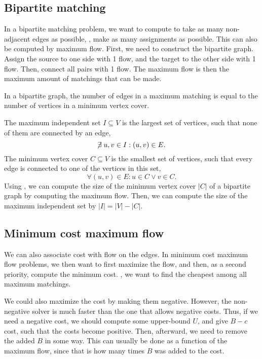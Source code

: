 \documentclass[justified,nobib]{tufte-handout}
\begin{document}
\subsection{Bipartite matching}

In a bipartite matching problem, we want to compute to take as many non-adjacent edges as possible,
\ie, make as many assignments as possible. This can also be computed by maximum flow. First, we
need to construct the bipartite graph. Assign the source to one side with 1 flow, and the target to
the other side with 1 flow. Then, connect all pairs with 1 flow. The maximum flow is then the
maximum amount of matchings that can be made.

\begin{theorem}[K\"onig]
    \label{thm:konig}

    In a bipartite graph, the number of edges in a maximum matching is equal to the number of vertices
    in a minimum vertex cover.
\end{theorem}

The maximum independent set $I\subseteq V$ is the largest set of vertices, such that none of them
are connected by an edge, \[
    \centernot \exists u,v\in I : (u,v) \in E.
\]
The minimum vertex cover $C \subseteq V$ is the smallest set of vertices, such that every edge is
connected to one of the vertices in this set, \[
    \forall (u,v) \in E : u \in C \lor v \in C.
\]
Using , we can compute the size of the minimum vertex cover $|C|$ of a bipartite
graph by computing the maximum flow. Then, we can compute the size of the maximum independent set
by $|I| = |V| - |C|$.

\subsection{Minimum cost maximum flow}


We can also associate cost with flow on the edges. In minimum cost maximum flow problems, we then
want to first maximize the flow, and then, as a second priority, compute the minimum cost. \Ie, we
want to find the cheapest among all maximum matchings.

We could also maximize the cost by making them negative. However, the non-negative solver is much
faster than the one that allows negative costs. Thus, if we need a negative cost, we should compute
some upper-bound $U$, and give $B-c$ cost, such that the costs become positive. Then, afterward, we
need to remove the added $B$ in some way. This can usually be done as a function of the maximum
flow, since that is how many times $B$ was added to the cost.
\end{document}
